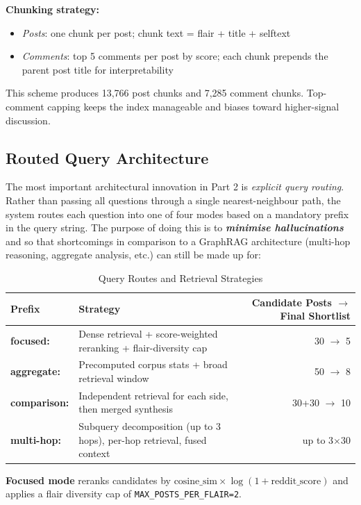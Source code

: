 \documentclass[11pt,a4paper]{article}
\begin{document}
\textbf{Chunking strategy:}
\begin{itemize}
  \item \textit{Posts}: one chunk per post; chunk text = flair + title + selftext
  \item \textit{Comments}: top 5 comments per post by score; each chunk prepends the parent post title for interpretability
\end{itemize}

This scheme produces 13{,}766 post chunks and 7{,}285 comment chunks. Top-comment capping keeps the index manageable and biases toward higher-signal discussion.

\subsection{Routed Query Architecture}

The most important architectural innovation in Part 2 is \textit{explicit query routing}. Rather than passing all questions through a single nearest-neighbour path, the system routes each question into one of four modes based on a mandatory prefix in the query string. The purpose of doing this is to \textbf{\textit{minimise hallucinations}} and so that shortcomings in comparison to a GraphRAG architecture (multi-hop reasoning, aggregate analysis, etc.) can still be made up for:

\begin{table}[H]
\centering
\caption{Query Routes and Retrieval Strategies}
\renewcommand{\arraystretch}{1.4}
\begin{tabularx}{0.95\textwidth}{>{\ttfamily\bfseries}l X >{\small}r}
\toprule
\rowcolor{navyblue!10}
Prefix & Strategy & Candidate Posts $\to$ Final Shortlist\\
\midrule
focused: & Dense retrieval + score-weighted reranking + flair-diversity cap & 30 $\to$ 5 \\
aggregate: & Precomputed corpus stats + broad retrieval window & 50 $\to$ 8 \\
comparison: & Independent retrieval for each side, then merged synthesis & 30+30 $\to$ 10 \\
multi-hop: & Subquery decomposition (up to 3 hops), per-hop retrieval, fused context & up to 3$\times$30 \\
\bottomrule
\end{tabularx}
\end{table}

\textbf{Focused mode} reranks candidates by $\text{cosine\_sim} \times \log(1 + \text{reddit\_score})$ and applies a flair diversity cap of \texttt{MAX\_POSTS\_PER\_FLAIR=2}. 
\end{document}
